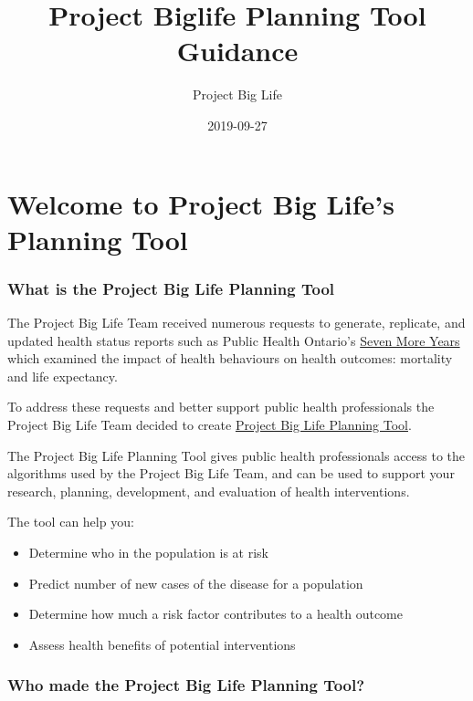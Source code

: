\documentclass[]{book}
\title{Project Biglife Planning Tool Guidance}
\author{Project Big Life}
\date{2019-09-27}
\providecommand{\tightlist}{%
  \setlength{\itemsep}{0pt}\setlength{\parskip}{0pt}}
\begin{document}
\maketitle

{
\setcounter{tocdepth}{1}
\tableofcontents
}
\hypertarget{welcome-to-project-big-lifes-planning-tool}{%
\chapter{Welcome to Project Big Life's Planning Tool}\label{welcome-to-project-big-lifes-planning-tool}}

\hypertarget{what-is-the-project-big-life-planning-tool}{%
\subsection{What is the Project Big Life Planning Tool}\label{what-is-the-project-big-life-planning-tool}}

The Project Big Life Team received numerous requests to generate, replicate, and updated health status reports such as Public Health Ontario's \href{https://www.ices.on.ca/Publications/Atlases-and-Reports/2012/Seven-More-Years}{Seven More Years} which examined the impact of health behaviours on health outcomes: mortality and life expectancy.

To address these requests and better support public health professionals the Project Big Life Team decided to create \href{http://planning.projectbiglife.ca/}{Project Big Life Planning Tool}.

The Project Big Life Planning Tool gives public health professionals access to the algorithms used by the Project Big Life Team, and can be used to support your research, planning, development, and evaluation of health interventions.

The tool can help you:

\begin{itemize}
\tightlist
\item
  Determine who in the population is at risk
\item
  Predict number of new cases of the disease for a population
\item
  Determine how much a risk factor contributes to a health outcome
\item
  Assess health benefits of potential interventions
\end{itemize}

\hypertarget{who-made-the-project-big-life-planning-tool}{%
\subsection{Who made the Project Big Life Planning Tool?}\label{who-made-the-project-big-life-planning-tool}}
\end{document}
